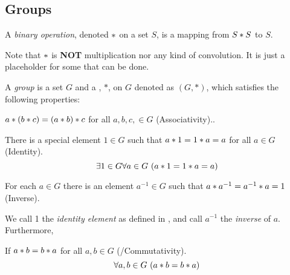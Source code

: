 \subsection{Groups}\label{subsec:Groups}
\begin{definition}\label{def:Binary_Operation}
  A \emph{binary operation}, denoted $*$ on a set $S$, is a mapping from $S * S$ to $S$.
  \begin{remark}
    Note that $*$ is \textbf{NOT} multiplication nor any kind of convolution.
    It is just a placeholder for some  that can be done.
  \end{remark}
\end{definition}

\begin{definition}[Group]\label{def:Group}
  A \emph{group} is a set $G$ and a , $*$, on $G$ denoted as $(G, *)$, which satisfies the following properties:
  \begin{propertylist}
  \item $a * (b * c) = (a * b) * c$ for all $a, b, c, \in G$ (Associativity).\label{prop:Group_Properties-Associativity}.
  \item There is a special element $1 \in G$ such that $a * 1 = 1 * a = a$ for all $a \in G$ (Identity).\label{prop:Group_Properties-Identity}
    \begin{equation*}
      \exists 1 \in G \forall a \in G \, \left( a * 1 = 1 * a = a \right)
    \end{equation*}

  \item For each $a \in G$ there is an element $a^{-1} \in G$ such that $a * a^{-1} = a^{-1} * a = 1$  (Inverse).\label{prop:Group_Properties-Inverse}
  \end{propertylist}

  We call 1 the \emph{identity element} as defined in , and call $a^{-1}$ the \emph{inverse} of $a$.
  Furthermore,
  \begin{propertylist}[resume]
  \item If $a * b = b * a$ for all $a,b \in G$ (/Commutativity).\label{prop:Group_Properties-Commutativity}
    \begin{equation*}
      \forall a,b \in G \, \left( a * b = b * a \right)
    \end{equation*}
  \end{propertylist}
\end{definition}


